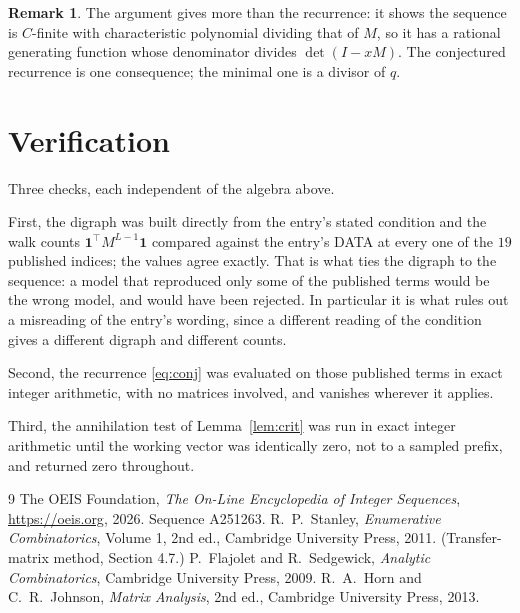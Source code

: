 \documentclass[11pt,a4paper]{article}
\theoremstyle{plain}
\theoremstyle{definition}
\newtheorem{remark}[theorem]{Remark}
\begin{document}
\begin{remark}
The argument gives more than the recurrence: it shows the sequence is $C$-finite with
characteristic polynomial dividing that of $M$, so it has a rational generating function
whose denominator divides $\det(I-xM)$. The conjectured recurrence is one consequence; the
minimal one is a divisor of $q$.
\end{remark}

\section{Verification}

Three checks, each independent of the algebra above.

First, the digraph was built directly from the entry's stated condition and the walk counts
$\mathbf{1}^{\!\top}M^{L-1}\mathbf{1}$ compared against the entry's DATA at
every one of the $19$ published indices; the values agree exactly. That is what ties
the digraph to the sequence: a model that reproduced only some of the published terms would
be the wrong model, and would have been rejected. In particular it is what rules out a
misreading of the entry's wording, since a different reading of the condition gives a
different digraph and different counts.

Second, the recurrence \eqref{eq:conj} was evaluated on those published terms in exact
integer arithmetic, with no matrices involved, and vanishes wherever it applies.

Third, the annihilation test of Lemma~\ref{lem:crit} was run in exact integer arithmetic
until the working vector was identically zero, not to a sampled prefix, and returned zero
throughout.

\begin{thebibliography}{9}
 The OEIS Foundation, \emph{The On-Line Encyclopedia of Integer
Sequences}, \url{https://oeis.org}, 2026. Sequence A251263.
 R.~P.~Stanley, \emph{Enumerative Combinatorics}, Volume 1, 2nd ed.,
Cambridge University Press, 2011. (Transfer-matrix method, Section 4.7.)
 P.~Flajolet and R.~Sedgewick, \emph{Analytic Combinatorics}, Cambridge
University Press, 2009.
 R.~A.~Horn and C.~R.~Johnson, \emph{Matrix Analysis}, 2nd ed., Cambridge
University Press, 2013.
\end{thebibliography}
\end{document}

